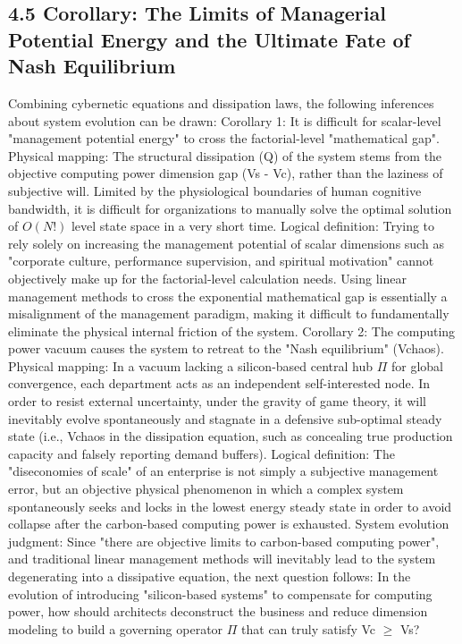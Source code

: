 \documentclass[11pt,a4paper]{article}
\begin{document}
\subsection*{4.5 Corollary: The Limits of Managerial Potential Energy and the Ultimate Fate of Nash Equilibrium}


Combining cybernetic equations and dissipation laws, the following inferences about system evolution can be drawn: Corollary 1: It is difficult for scalar-level "management potential energy" to cross the factorial-level "mathematical gap". Physical mapping: The structural dissipation (Q) of the system stems from the objective computing power dimension gap (Vs - Vc), rather than the laziness of subjective will. Limited by the physiological boundaries of human cognitive bandwidth, it is difficult for organizations to manually solve the optimal solution of $O(N!)$ level state space in a very short time. Logical definition: Trying to rely solely on increasing the management potential of scalar dimensions such as "corporate culture, performance supervision, and spiritual motivation" cannot objectively make up for the factorial-level calculation needs. Using linear management methods to cross the exponential mathematical gap is essentially a misalignment of the management paradigm, making it difficult to fundamentally eliminate the physical internal friction of the system. Corollary 2: The computing power vacuum causes the system to retreat to the "Nash equilibrium" (Vchaos). Physical mapping: In a vacuum lacking a silicon-based central hub $\Pi$ for global convergence, each department acts as an independent self-interested node. In order to resist external uncertainty, under the gravity of game theory, it will inevitably evolve spontaneously and stagnate in a defensive sub-optimal steady state (i.e., Vchaos in the dissipation equation, such as concealing true production capacity and falsely reporting demand buffers). Logical definition: The "diseconomies of scale" of an enterprise is not simply a subjective management error, but an objective physical phenomenon in which a complex system spontaneously seeks and locks in the lowest energy steady state in order to avoid collapse after the carbon-based computing power is exhausted. System evolution judgment: Since "there are objective limits to carbon-based computing power", and traditional linear management methods will inevitably lead to the system degenerating into a dissipative equation, the next question follows: In the evolution of introducing "silicon-based systems" to compensate for computing power, how should architects deconstruct the business and reduce dimension modeling to build a governing operator $\Pi$ that can truly satisfy Vc $\ge$ Vs?
\end{document}
